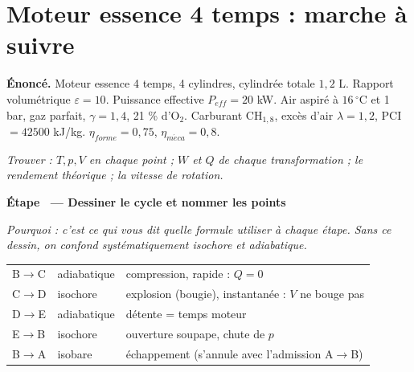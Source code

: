 \documentclass[10.5pt,a4paper]{article}
\newcounter{et}[section]
\newcommand{\etape}[1]{%
  \refstepcounter{et}%
  \medskip\par\noindent
  {\color{cbleu}\bfseries Étape \theet\ --- #1}\par\nobreak\smallskip}
\newcommand{\pq}[1]{{\color{cgris}\itshape\small Pourquoi : #1\par}\smallskip}
\begin{document}
\newpage
\section{Moteur essence 4 temps : marche à suivre}

\begin{enonce}
\textbf{Énoncé.} Moteur essence 4 temps, 4 cylindres, cylindrée totale $1{,}2$ L. Rapport volumétrique
$\varepsilon=10$. Puissance effective $P_{eff}=20$ kW. Air aspiré à $16\,^\circ$C et 1 bar, gaz parfait,
$\gamma=1{,}4$, 21 \% d'O$_2$. Carburant CH$_{1,8}$, excès d'air $\lambda=1{,}2$, PCI $=42500$ kJ/kg.
$\eta_{forme}=0{,}75$, $\eta_{m\acute{e}ca}=0{,}8$.

\emph{Trouver : $T,p,V$ en chaque point ; $W$ et $Q$ de chaque transformation ; le rendement théorique ;
la vitesse de rotation.}
\end{enonce}

\etape{Dessiner le cycle et nommer les points}
\pq{c'est ce qui vous dit quelle formule utiliser à chaque étape. Sans ce dessin, on confond
systématiquement isochore et adiabatique.}

\begin{center}
\end{center}

\begin{center}\small
\begin{tabularx}{0.85\linewidth}{@{}l l X@{}}
\toprule
B$\to$C & \textcolor{crouge}{adiabatique} & compression, rapide : $Q=0$ \\
C$\to$D & \textcolor{cvert}{isochore} & explosion (bougie), instantanée : $V$ ne bouge pas \\
D$\to$E & \textcolor{crouge}{adiabatique} & détente = temps moteur \\
E$\to$B & \textcolor{cvert}{isochore} & ouverture soupape, chute de $p$ \\
B$\to$A & \textcolor{cbleu}{isobare} & échappement (s'annule avec l'admission A$\to$B) \\
\bottomrule
\end{tabularx}
\end{center}
\end{document}
